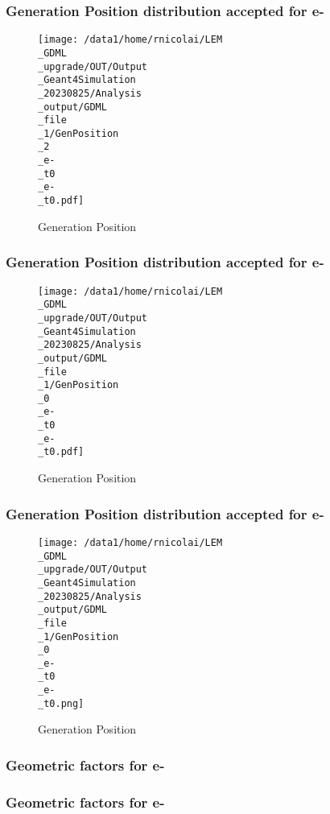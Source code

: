 \documentclass[8pt]{beamer}
\begin{document}
            \begin{frame}
                \frametitle{Generation Position distribution accepted for e-}
            
        \begin{figure}[h]
            \centering
            \texttt{[image: /data1/home/rnicolai/LEM\\\_GDML\\\_upgrade/OUT/Output\\\_Geant4Simulation\\\_20230825/Analysis\\\_output/GDML\\\_file\\\_1/GenPosition\\\_2\\\_e-\\\_t0\\\_e-\\\_t0.pdf]}
            \caption{Generation Position}
        \end{figure}
        
            \end{frame}
            
            \begin{frame}
                \frametitle{Generation Position distribution accepted for e-}
            
        \begin{figure}[h]
            \centering
            \texttt{[image: /data1/home/rnicolai/LEM\\\_GDML\\\_upgrade/OUT/Output\\\_Geant4Simulation\\\_20230825/Analysis\\\_output/GDML\\\_file\\\_1/GenPosition\\\_0\\\_e-\\\_t0\\\_e-\\\_t0.pdf]}
            \caption{Generation Position}
        \end{figure}
        
            \end{frame}
            
            \begin{frame}
                \frametitle{Generation Position distribution accepted for e-}
            
        \begin{figure}[h]
            \centering
            \texttt{[image: /data1/home/rnicolai/LEM\\\_GDML\\\_upgrade/OUT/Output\\\_Geant4Simulation\\\_20230825/Analysis\\\_output/GDML\\\_file\\\_1/GenPosition\\\_0\\\_e-\\\_t0\\\_e-\\\_t0.png]}
            \caption{Generation Position}
        \end{figure}
        
            \end{frame}
            
            \begin{frame}
                \frametitle{Geometric factors for e-}
            
            \end{frame}
            
            \begin{frame}
                \frametitle{Geometric factors for e-}
            
            \end{frame}
            
\end{document}
